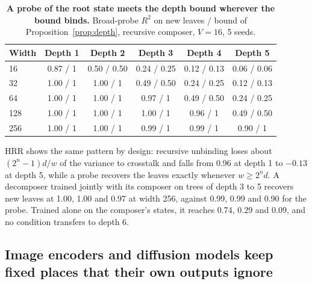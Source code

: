 \begin{table}[h]
  \caption{\textbf{A probe of the root state meets the depth bound wherever the bound binds.} Broad-probe $R^2$ on new leaves / bound of Proposition~\ref{prop:depth}, recursive composer, $V = 16$, 5 seeds.}
  \label{tab:depth}
  \centering\footnotesize
  \begin{tabular}{@{}lccccc@{}}
    \toprule
    Width & Depth 1 & Depth 2 & Depth 3 & Depth 4 & Depth 5 \\
    \midrule
    16 & 0.87 / 1 & 0.50 / 0.50 & 0.24 / 0.25 & 0.12 / 0.13 & 0.06 / 0.06 \\
    32 & 1.00 / 1 & 1.00 / 1 & 0.49 / 0.50 & 0.24 / 0.25 & 0.12 / 0.13 \\
    64 & 1.00 / 1 & 1.00 / 1 & 0.97 / 1 & 0.49 / 0.50 & 0.24 / 0.25 \\
    128 & 1.00 / 1 & 1.00 / 1 & 1.00 / 1 & 0.96 / 1 & 0.49 / 0.50 \\
    256 & 1.00 / 1 & 1.00 / 1 & 0.99 / 1 & 0.99 / 1 & 0.90 / 1 \\
    \bottomrule
  \end{tabular}
\end{table}
 HRR shows the same pattern by design: recursive unbinding loses about $(2^n - 1)d/w$ of the variance to crosstalk and falls from 0.96 at depth 1 to $-0.13$ at depth 5, while a probe recovers the leaves exactly whenever $w \ge 2^n d$. A decomposer trained jointly with its composer on trees of depth 3 to 5 recovers new leaves at 1.00, 1.00 and 0.97 at width 256, against 0.99, 0.99 and 0.90 for the probe. Trained alone on the composer's states, it reaches 0.74, 0.29 and 0.09, and no condition transfers to depth 6.

\subsection{Image encoders and diffusion models keep fixed places that their own outputs ignore}
\label{app:images}
\label{app:diffusion}

